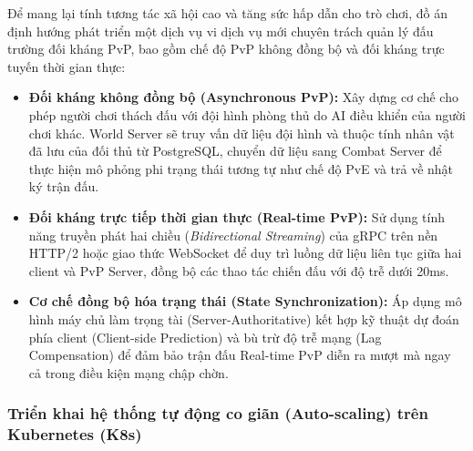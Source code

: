 \documentclass[../Project.tex]{subfiles}
\begin{document}
Để mang lại tính tương tác xã hội cao và tăng sức hấp dẫn cho trò chơi, đồ án định hướng phát triển một dịch vụ vi dịch vụ mới chuyên trách quản lý đấu trường đối kháng PvP, bao gồm chế độ PvP không đồng bộ và đối kháng trực tuyến thời gian thực:
\begin{itemize}
    \item \textbf{Đối kháng không đồng bộ (Asynchronous PvP):} Xây dựng cơ chế cho phép người chơi thách đấu với đội hình phòng thủ do AI điều khiển của người chơi khác. World Server sẽ truy vấn dữ liệu đội hình và thuộc tính nhân vật đã lưu của đối thủ từ PostgreSQL, chuyển dữ liệu sang Combat Server để thực hiện mô phỏng phi trạng thái tương tự như chế độ PvE và trả về nhật ký trận đấu.
    \item \textbf{Đối kháng trực tiếp thời gian thực (Real-time PvP):} Sử dụng tính năng truyền phát hai chiều (\textit{Bidirectional Streaming}) của gRPC trên nền HTTP/2 hoặc giao thức WebSocket \cite{rfc6455} để duy trì luồng dữ liệu liên tục giữa hai client và PvP Server, đồng bộ các thao tác chiến đấu với độ trễ dưới 20ms.
    \item \textbf{Cơ chế đồng bộ hóa trạng thái (State Synchronization):} Áp dụng mô hình máy chủ làm trọng tài (Server-Authoritative) kết hợp kỹ thuật dự đoán phía client (Client-side Prediction) và bù trừ độ trễ mạng (Lag Compensation) để đảm bảo trận đấu Real-time PvP diễn ra mượt mà ngay cả trong điều kiện mạng chập chờn.
\end{itemize}

\subsubsection{Triển khai hệ thống tự động co giãn (Auto-scaling) trên Kubernetes (K8s)}
\end{document}
